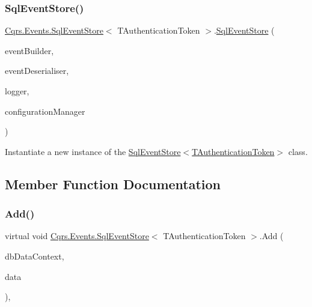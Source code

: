 \subsubsection{\texorpdfstring{Sql\+Event\+Store()}{SqlEventStore()}}
{\footnotesize\ttfamily \hyperlink{classCqrs_1_1Events_1_1SqlEventStore}{Cqrs.\+Events.\+Sql\+Event\+Store}$<$ T\+Authentication\+Token $>$.\hyperlink{classCqrs_1_1Events_1_1SqlEventStore}{Sql\+Event\+Store} (\begin{DoxyParamCaption}\item[{\hyperlink{interfaceCqrs_1_1Events_1_1IEventBuilder}{I\+Event\+Builder}$<$ T\+Authentication\+Token $>$}]{event\+Builder,  }\item[{\hyperlink{interfaceCqrs_1_1Events_1_1IEventDeserialiser}{I\+Event\+Deserialiser}$<$ T\+Authentication\+Token $>$}]{event\+Deserialiser,  }\item[{I\+Logger}]{logger,  }\item[{\hyperlink{interfaceCqrs_1_1Configuration_1_1IConfigurationManager}{I\+Configuration\+Manager}}]{configuration\+Manager }\end{DoxyParamCaption})}



Instantiate a new instance of the \hyperlink{classCqrs_1_1Events_1_1SqlEventStore_a15df78a1b12d2e3035b9715e9bfc8535_a15df78a1b12d2e3035b9715e9bfc8535}{Sql\+Event\+Store$<$\+T\+Authentication\+Token$>$} class. 



\subsection{Member Function Documentation}
\mbox{\label{classCqrs_1_1Events_1_1SqlEventStore_a94ce64c00db57e5b9dbd10f74a4cef5b_a94ce64c00db57e5b9dbd10f74a4cef5b}} 
\subsubsection{\texorpdfstring{Add()}{Add()}}
{\footnotesize\ttfamily virtual void \hyperlink{classCqrs_1_1Events_1_1SqlEventStore}{Cqrs.\+Events.\+Sql\+Event\+Store}$<$ T\+Authentication\+Token $>$.Add (\begin{DoxyParamCaption}\item[{Data\+Context}]{db\+Data\+Context,  }\item[{\hyperlink{classCqrs_1_1Events_1_1EventData}{Event\+Data}}]{data }\end{DoxyParamCaption})\hspace{0.3cm}{\ttfamily [protected]}, {\ttfamily [virtual]}}



